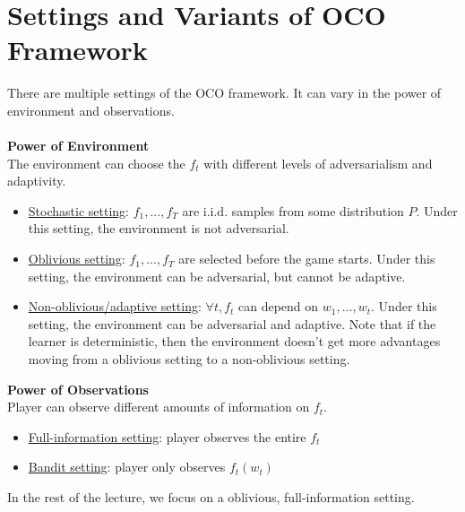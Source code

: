 \documentclass[11pt]{article}
\newcommand{\1}{\mathbb{I}} %
\begin{document}
\section{Settings and Variants of OCO Framework}
There are multiple settings of the OCO framework. It can vary in the power of environment and observations. \\\\
\textbf{Power of Environment}\\
The environment can choose the $f_t$ with different levels of adversarialism and adaptivity.
\begin{itemize}
\item \underline{Stochastic setting}: $f_1, ..., f_T$ are i.i.d. samples from some distribution $P$. Under this setting, the environment is not adversarial.
\item \underline{Oblivious setting}: $f_1, ..., f_T$ are selected before the game starts. Under this setting, the environment can be adversarial, but cannot be adaptive. 
\item \underline{Non-oblivious/adaptive setting}: $\forall t, f_t$ can depend on $w_1, ..., w_t$. Under this setting, the environment can be adversarial and adaptive. Note that if the learner is deterministic, then the environment doesn't get more advantages moving from a oblivious setting to a non-oblivious setting.
\end{itemize}
\textbf{Power of Observations}\\
Player can observe different amounts of information on $f_t$. 
\begin{itemize}
\item \underline{Full-information setting}: player observes the entire $f_t$ 
\item \underline{Bandit setting}: player only observes $f_t(w_t)$ 
\end{itemize}
In the rest of the lecture, we focus on a oblivious, full-information setting.
\end{document}
